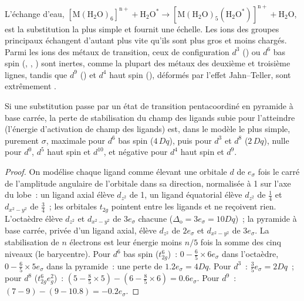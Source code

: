 L'échange d'eau, $\mathrm{[M(H_2O)_6]^{n+} + H_2O^{\ast} \to [M(H_2O)_5(H_2O^{\ast})]^{n+} + H_2O}$, est la substitution la plus
simple et fournit une échelle. Les ions des groupes principaux échangent
d'autant plus vite qu'ils sont plus gros et moins chargés. Parmi les ions
des métaux de transition, ceux de configuration $d^3$ () ou $d^6$
bas spin (, , ) sont inertes, comme la
plupart des métaux des deuxième et troisième lignes, tandis que $d^9$
() et $d^4$ haut spin (), déformés par l'effet
Jahn--Teller, sont extrêmement .

\begin{proposition}\label{prop:b3:complex-mechanisms:lfae}
Si une substitution passe par un état de transition pentacoordiné en
pyramide à base carrée, la perte de stabilisation du champ des ligands
subie pour l'atteindre (l'énergie d'activation de champ des ligands) est,
dans le modèle le plus simple, purement $\sigma$, maximale pour $d^6$ bas
spin ($4\,Dq$), puis pour $d^3$ et $d^8$ ($2\,Dq$), nulle pour $d^0$, $d^5$
haut spin et $d^{10}$, et négative pour $d^4$ haut spin et $d^9$.
\end{proposition}

\begin{proof}
On modélise chaque ligand comme élevant une orbitale $d$ de $e_\sigma$ fois
le carré de l'amplitude angulaire de l'orbitale dans sa direction,
normalisée à 1 sur l'axe du lobe~: un ligand axial élève $d_{z^2}$ de 1, un
ligand équatorial élève $d_{z^2}$ de $\frac14$ et $d_{x^2-y^2}$ de $\frac34$~; les orbitales $t_{2g}$
pointent entre les ligands et ne reçoivent rien. L'octaèdre élève $d_{z^2}$
et $d_{x^2-y^2}$ de $3e_\sigma$ chacune ($\Delta_{\mathrm o} = 3e_\sigma = 10Dq$)~; la pyramide à base
carrée, privée d'un ligand axial, élève $d_{z^2}$ de $2e_\sigma$ et $d_{x^2-y^2}$
de $3e_\sigma$. La stabilisation de $n$ électrons est leur énergie moins
$n/5$ fois la somme des cinq niveaux (le barycentre). Pour $d^6$ bas spin
($t_{2g}^6$)~: $0 - \frac65 \times 6e_\sigma$ dans l'octaèdre, $0 - \frac65 \times 5e_\sigma$ dans la
pyramide~: une perte de $1.2e_\sigma = 4Dq$. Pour $d^3$~: $\frac35e_\sigma =
2Dq$~; pour $d^8$ ($t_{2g}^6e_g^2$)~: $(5 - \frac85 \times 5) - (6 - \frac85 \times 6) = 0.6e_\sigma$. Pour $d^9$~: $(7 - 9) - (9 -
10.8) = -0.2e_\sigma$.
\end{proof}

